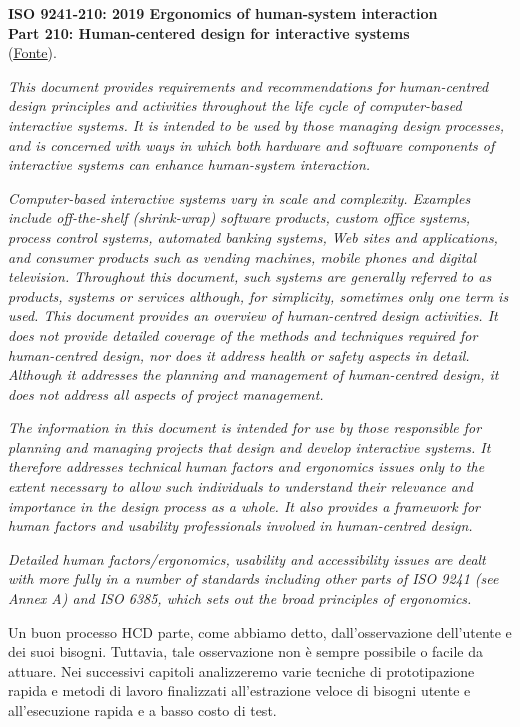 \vspace{\baselineskip}
\textbf{ISO 9241-210: 2019 Ergonomics of human-system interaction \\Part 210: Human-centered design for interactive systems}
\\(\href{https://www.iso.org/standard/77520.html}{\underline{Fonte}}).
\vspace{\baselineskip}

\textit{This document provides requirements and recommendations for human-centred design principles and activities throughout the life cycle of
computer-based interactive systems. It is intended to be used by those managing design processes, and is concerned with ways in which both hardware
and software components of interactive systems can enhance human-system interaction.}

\textit{Computer-based interactive systems vary in scale and complexity. Examples include off-the-shelf (shrink-wrap) software products, custom office
systems, process control systems, automated banking systems, Web sites and applications, and consumer products such as vending machines, mobile phones
and digital television. Throughout this document, such systems are generally referred to as products, systems or services although, for simplicity,
sometimes only one term is used. This document provides an overview of human-centred design activities. It does not provide detailed coverage of the
methods and techniques required for human-centred design, nor does it address health or safety aspects in detail. Although it addresses the planning
and management of human-centred design, it does not address all aspects of project management. }

\textit{The information in this document is intended for use by those responsible for planning and managing projects that design and develop interactive
systems. It therefore addresses technical human factors and ergonomics issues only to the extent necessary to allow such individuals to understand their
relevance and importance in the design process as a whole. It also provides a framework for human factors and usability professionals involved in
human-centred design.}

\textit{Detailed human factors/ergonomics, usability and accessibility issues are dealt with more fully in a number of standards including other parts
of ISO 9241 (see Annex A) and ISO 6385, which sets out the broad principles of ergonomics.}

Un buon processo HCD parte, come abbiamo detto, dall'osservazione dell'utente e dei suoi bisogni. Tuttavia, tale osservazione non è sempre possibile o
facile da attuare. Nei successivi capitoli analizzeremo varie tecniche di prototipazione rapida e metodi di lavoro finalizzati all'estrazione veloce di
bisogni utente e all'esecuzione rapida e a basso costo di test. 

